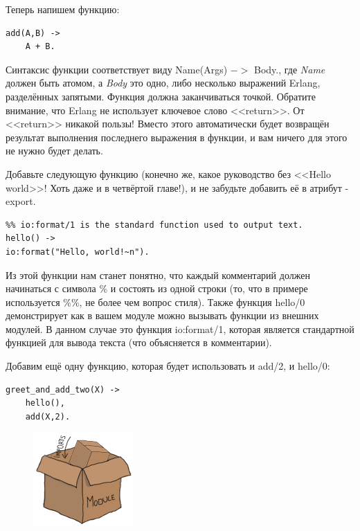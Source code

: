 \documentclass[a4paper,12pt]{report}
\newcommand{\ops}{\colorbox{lgreen}}
\begin{document}
Теперь напишем функцию:
\begin{lstlisting}[style=erlang]
add(A,B) ->
    A + B.
\end{lstlisting}

Синтаксис функции соответствует виду \ops{Name(Args) $->$ Body.}, где \emph{Name} должен быть атомом, а \emph{Body} это одно, либо несколько выражений Erlang, разделённых запятыми. Функция должна заканчиваться точкой. Обратите внимание, что Erlang не использует ключевое слово <<return>>. От <<return>> никакой пользы! Вместо этого автоматически будет возвращён результат выполнения последнего выражения в функции, и вам ничего для этого не нужно будет делать.

Добавьте следующую функцию (конечно же, какое руководство без <<Hello world>>! Хоть даже и в четвёртой главе!), и не забудьте добавить её в атрибут \ops{-export}.
\begin{lstlisting}[style=erlang]
%% Shows greetings.
%% io:format/1 is the standard function used to output text.
hello() ->
io:format("Hello, world!~n").
\end{lstlisting}

Из этой функции нам станет понятно, что каждый комментарий должен начинаться с символа \ops{\%} и состоять из одной строки (то, что в примере используется \ops{\%\%}, не более чем вопрос стиля). Также функция \ops{hello/0} демонстрирует как в вашем модуле можно вызывать функции из внешних модулей. В данном случае это функция \ops{io:format/1}, которая является стандартной функцией для вывода текста (что объясняется в комментарии).

Добавим ещё одну функцию, которая будет использовать и \ops{add/2}, и \ops{hello/0}:
\begin{lstlisting}[style=erlang]
greet_and_add_two(X) ->
    hello(),
    add(X,2).
\end{lstlisting}
\begin{figure}
    \includegraphics[width=1\linewidth]{imports.png}
\end{figure}
\end{document}
